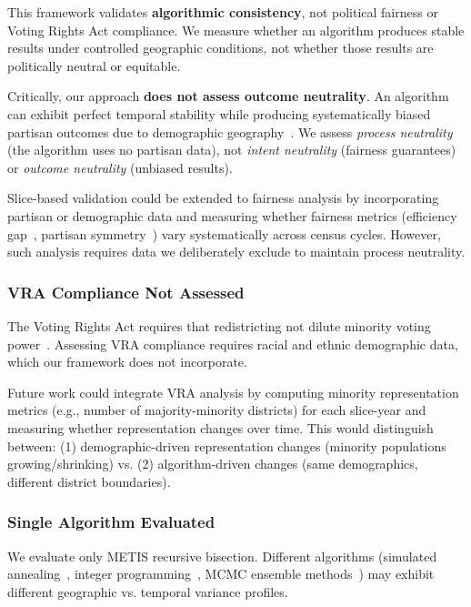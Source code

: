 This framework validates \textbf{algorithmic consistency}, not political fairness or Voting Rights Act compliance. We measure whether an algorithm produces stable results under controlled geographic conditions, not whether those results are politically neutral or equitable.

Critically, our approach \textbf{does not assess outcome neutrality}. An algorithm can exhibit perfect temporal stability while producing systematically biased partisan outcomes due to demographic geography~\cite{rodden2019}. We assess \textit{process neutrality} (the algorithm uses no partisan data), not \textit{intent neutrality} (fairness guarantees) or \textit{outcome neutrality} (unbiased results).

Slice-based validation could be extended to fairness analysis by incorporating partisan or demographic data and measuring whether fairness metrics (efficiency gap~\cite{stephanopoulos2015}, partisan symmetry~\cite{grofman1983}) vary systematically across census cycles. However, such analysis requires data we deliberately exclude to maintain process neutrality.

\subsubsection{VRA Compliance Not Assessed}

The Voting Rights Act requires that redistricting not dilute minority voting power~\cite{vra1965}. Assessing VRA compliance requires racial and ethnic demographic data, which our framework does not incorporate.

Future work could integrate VRA analysis by computing minority representation metrics (e.g., number of majority-minority districts) for each slice-year and measuring whether representation changes over time. This would distinguish between: (1) demographic-driven representation changes (minority populations growing/shrinking) vs. (2) algorithm-driven changes (same demographics, different district boundaries).

\subsubsection{Single Algorithm Evaluated}

We evaluate only METIS recursive bisection. Different algorithms (simulated annealing~\cite{altman1998}, integer programming~\cite{mehrotra1998}, MCMC ensemble methods~\cite{gerrychain2018}) may exhibit different geographic vs. temporal variance profiles.

